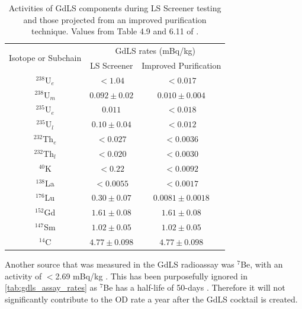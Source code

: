 \begin{table}[]
    \centering
    \begin{tabular}{c|c|c}
        \multirow{2}{*}{Isotope or Subchain}  &  \multicolumn{2}{c}{GdLS rates (mBq/kg)}      \\ 
                             &  LS Screener          & Improved Purification \\ \hline
        ${}^{238}$U$_{e}$      &  $< 1.04$             & $< 0.017$             \\ 
        ${}^{238}$U$_{m}$      &  $0.092\pm0.02$       & $0.010\pm0.004$       \\
        ${}^{235}$U$_{e}$      &  $0.011$              & $< 0.018$             \\
        ${}^{235}$U$_{l}$      &  $0.10\pm0.04$        & $< 0.012$             \\
        ${}^{232}$Th$_{e}$     &  $< 0.027$            & $< 0.0036$            \\
        ${}^{232}$Th$_{l}$     &  $< 0.020$            & $< 0.0030$            \\
        ${}^{40}$K           &  $< 0.22$             & $< 0.0092$            \\
        ${}^{138}$La         &  $< 0.0055$           & $< 0.0017$            \\
        ${}^{176}$Lu         &  $0.30\pm0.07$        & $0.0081\pm0.0018$     \\
        ${}^{152}$Gd       &  $1.61\pm0.08$        & $1.61\pm0.08$         \\
        ${}^{147}$Sm       &  $1.02\pm0.05$        & $1.02\pm0.05$         \\
        ${}^{14}$C         &  $4.77\pm0.098$       & $4.77\pm0.098$ 
    \end{tabular}
    \caption{Activities of GdLS components during LS Screener testing and those projected from an improved purification technique. Values from Table 4.9 and 6.11 of \cite{scotthaselschwardt_thesis_ref}.}
    \label{tab:gdls_assay_rates}
\end{table}
\par
Another source that was measured in the GdLS radioassay was ${}^{7}$Be, with an activity of $<$2.69 mBq/kg \cite{scotthaselschwardt_thesis_ref}.
This has been purposefully ignored in \autoref{tab:gdls_assay_rates} as ${}^{7}$Be has a half-life of 50-days \cite{be7_decay_ref}.
Therefore it will not significantly contribute to the OD rate a year after the GdLS cocktail is created.

